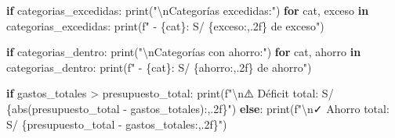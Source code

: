 \documentclass[
  doc,
  floatsintext,
  longtable,
  a4paper,
  nolmodern,
  notxfonts,
  notimes,
  12pt,
  colorlinks=true,linkcolor=blue,citecolor=blue,urlcolor=blue]{apa7}
\newenvironment{Shaded}{\begin{snugshade}}{\end{snugshade}}
\newcommand{\BuiltInTok}[1]{\textcolor[rgb]{0.00,0.23,0.31}{#1}}
\newcommand{\CharTok}[1]{\textcolor[rgb]{0.13,0.47,0.30}{#1}}
\newcommand{\ControlFlowTok}[1]{\textcolor[rgb]{0.00,0.23,0.31}{\textbf{#1}}}
\newcommand{\KeywordTok}[1]{\textcolor[rgb]{0.00,0.23,0.31}{\textbf{#1}}}
\newcommand{\NormalTok}[1]{\textcolor[rgb]{0.00,0.23,0.31}{#1}}
\newcommand{\OperatorTok}[1]{\textcolor[rgb]{0.37,0.37,0.37}{#1}}
\newcommand{\SpecialCharTok}[1]{\textcolor[rgb]{0.37,0.37,0.37}{#1}}
\newcommand{\SpecialStringTok}[1]{\textcolor[rgb]{0.13,0.47,0.30}{#1}}
\newcommand{\StringTok}[1]{\textcolor[rgb]{0.13,0.47,0.30}{#1}}
\begin{document}
\begin{Shaded}
\begin{Highlighting}[]
\ControlFlowTok{if}\NormalTok{ categorias\_excedidas:}
    \BuiltInTok{print}\NormalTok{(}\StringTok{"}\CharTok{\textbackslash{}n}\StringTok{Categorías excedidas:"}\NormalTok{)}
    \ControlFlowTok{for}\NormalTok{ cat, exceso }\KeywordTok{in}\NormalTok{ categorias\_excedidas:}
        \BuiltInTok{print}\NormalTok{(}\SpecialStringTok{f"  {-} }\SpecialCharTok{\{}\NormalTok{cat}\SpecialCharTok{\}}\SpecialStringTok{: S/ }\SpecialCharTok{\{}\NormalTok{exceso}\SpecialCharTok{:,.2f\}}\SpecialStringTok{ de exceso"}\NormalTok{)}

\ControlFlowTok{if}\NormalTok{ categorias\_dentro:}
    \BuiltInTok{print}\NormalTok{(}\StringTok{"}\CharTok{\textbackslash{}n}\StringTok{Categorías con ahorro:"}\NormalTok{)}
    \ControlFlowTok{for}\NormalTok{ cat, ahorro }\KeywordTok{in}\NormalTok{ categorias\_dentro:}
        \BuiltInTok{print}\NormalTok{(}\SpecialStringTok{f"  {-} }\SpecialCharTok{\{}\NormalTok{cat}\SpecialCharTok{\}}\SpecialStringTok{: S/ }\SpecialCharTok{\{}\NormalTok{ahorro}\SpecialCharTok{:,.2f\}}\SpecialStringTok{ de ahorro"}\NormalTok{)}

\ControlFlowTok{if}\NormalTok{ gastos\_totales }\OperatorTok{\textgreater{}}\NormalTok{ presupuesto\_total:}
    \BuiltInTok{print}\NormalTok{(}\SpecialStringTok{f"}\CharTok{\textbackslash{}n}\SpecialStringTok{⚠️ Déficit total: S/ }\SpecialCharTok{\{}\BuiltInTok{abs}\NormalTok{(presupuesto\_total }\OperatorTok{{-}}\NormalTok{ gastos\_totales)}\SpecialCharTok{:,.2f\}}\SpecialStringTok{"}\NormalTok{)}
\ControlFlowTok{else}\NormalTok{:}
    \BuiltInTok{print}\NormalTok{(}\SpecialStringTok{f"}\CharTok{\textbackslash{}n}\SpecialStringTok{✓ Ahorro total: S/ }\SpecialCharTok{\{}\NormalTok{presupuesto\_total }\OperatorTok{{-}}\NormalTok{ gastos\_totales}\SpecialCharTok{:,.2f\}}\SpecialStringTok{"}\NormalTok{)}
\end{Highlighting}
\end{Shaded}
\end{document}
